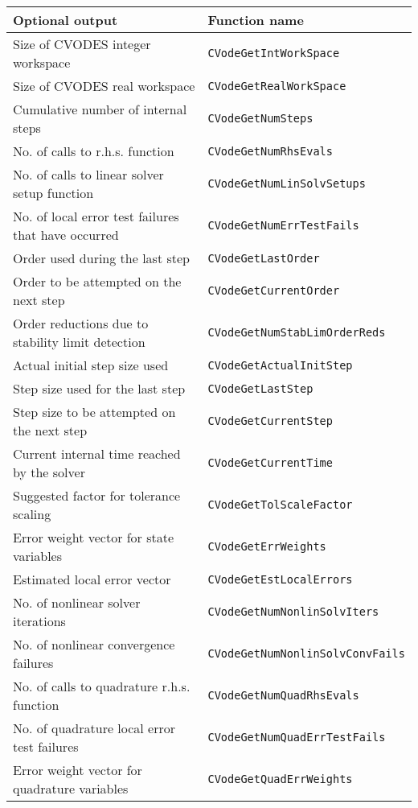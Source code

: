 \begin{acmtable}{\textwidth}
\centering
\begin{tabularx}{\textwidth}{ll}
{\bf Optional output} & {\bf Function name} \\
\hline
Size of CVODES integer workspace & {\tt CVodeGetIntWorkSpace} \\
Size of CVODES real workspace & {\tt CVodeGetRealWorkSpace} \\
Cumulative number of internal steps & {\tt CVodeGetNumSteps} \\
No. of calls to r.h.s. function & {\tt CVodeGetNumRhsEvals} \\
No. of calls to linear solver setup function & {\tt CVodeGetNumLinSolvSetups} \\
No. of local error test failures that have occurred & {\tt CVodeGetNumErrTestFails} \\
Order used during the last step & {\tt CVodeGetLastOrder} \\
Order to be attempted on the next step & {\tt CVodeGetCurrentOrder} \\
Order reductions due to stability limit detection & {\tt CVodeGetNumStabLimOrderReds} \\
Actual initial step size used & {\tt CVodeGetActualInitStep} \\
Step size used for the last step & {\tt CVodeGetLastStep} \\
Step size to be attempted on the next step & {\tt CVodeGetCurrentStep} \\
Current internal time reached by the solver & {\tt CVodeGetCurrentTime} \\
Suggested factor for tolerance scaling  & {\tt CVodeGetTolScaleFactor} \\
Error weight vector for state variables & {\tt CVodeGetErrWeights} \\
Estimated local error vector & {\tt CVodeGetEstLocalErrors} \\
No. of nonlinear solver iterations & {\tt CVodeGetNumNonlinSolvIters} \\
No. of nonlinear convergence failures & {\tt CVodeGetNumNonlinSolvConvFails} \\
No. of calls to quadrature r.h.s. function & {\tt CVodeGetNumQuadRhsEvals} \\
No. of quadrature local error test failures & {\tt CVodeGetNumQuadErrTestFails} \\
Error weight vector for quadrature variables & {\tt CVodeGetQuadErrWeights} \\

\end{tabularx}
\end{acmtable}

